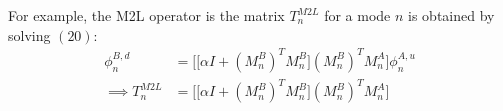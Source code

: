 For example, the M2L operator is the matrix $T^{M2L}_n$ for a mode $n$ is obtained by solving $(20)$:
\begin{align}
\phi^{B,d}_n&=\bigg[\big[\alpha I +(M_n^B)^TM_n^B\big](M_n^B)^TM_n^A\bigg]\phi^{A,u}_n\\
\implies T^{M2L}_n &= \bigg[\big[\alpha I +(M_n^B)^TM_n^B\big](M_n^B)^TM_n^A\bigg]
\end{align}

